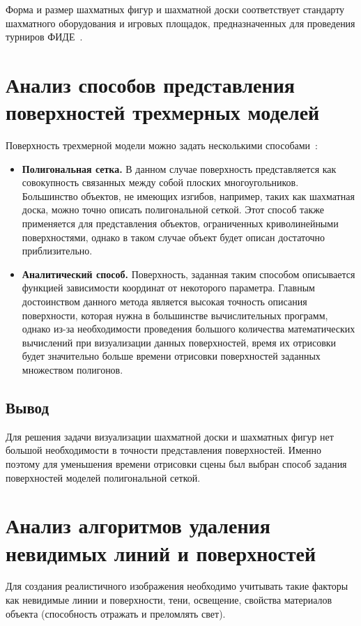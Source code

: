 Форма и размер шахматных фигур и шахматной доски соответствует стандарту шахматного оборудования и игровых площадок, предназначенных для проведения турниров ФИДЕ~\cite{FIDE2015}.

\clearpage
\section{Анализ способов представления поверхностей трехмерных моделей}
Поверхность трехмерной модели можно задать несколькими способами~\cite{deymin}:
\begin{itemize}
	\item \textbf{Полигональная сетка.} В данном случае поверхность представляется как совокупность связанных между собой плоских многоугольников. Большинство объектов, не имеющих изгибов, например, таких как шахматная доска, можно точно описать полигональной сеткой. Этот способ также применяется для представления объектов, ограниченных криволинейными
	поверхностями, однако в таком случае объект будет описан достаточно приблизительно.
	
	\item \textbf{Аналитический способ.} Поверхность, заданная таким способом описывается функцией зависимости координат от некоторого параметра. Главным достоинством данного метода является высокая точность описания поверхности, которая нужна в большинстве вычислительных программ, однако из-за необходимости проведения большого количества математических вычислений при визуализации данных поверхностей, время их отрисовки будет значительно больше времени отрисовки поверхностей заданных множеством полигонов.
\end{itemize}

\subsection*{Вывод}
Для решения задачи визуализации шахматной доски и шахматных фигур нет большой необходимости в точности представления поверхностей. Именно поэтому для уменьшения времени отрисовки сцены был выбран способ задания поверхностей моделей полигональной сеткой.

\clearpage
\section{Анализ алгоритмов удаления невидимых линий и поверхностей}
Для создания реалистичного изображения необходимо учитывать такие факторы как невидимые линии и поверхности, тени, освещение, свойства материалов объекта (способность отражать и преломлять свет).


